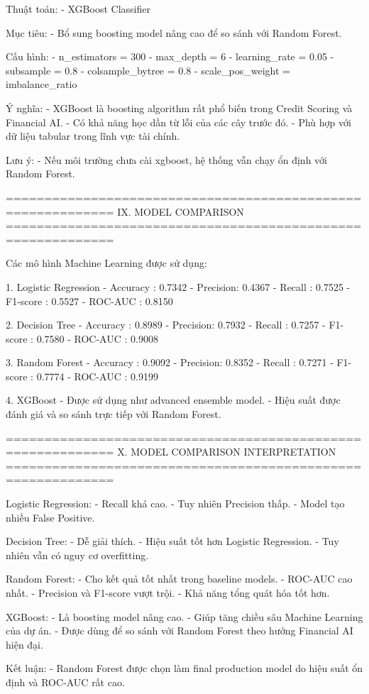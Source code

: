 Thuật toán:
- XGBoost Classifier

Mục tiêu:
- Bổ sung boosting model nâng cao để so sánh với Random Forest.

Cấu hình:
- n_estimators = 300
- max_depth = 6
- learning_rate = 0.05
- subsample = 0.8
- colsample_bytree = 0.8
- scale_pos_weight = imbalance_ratio

Ý nghĩa:
- XGBoost là boosting algorithm rất phổ biến trong Credit Scoring và Financial AI.
- Có khả năng học dần từ lỗi của các cây trước đó.
- Phù hợp với dữ liệu tabular trong lĩnh vực tài chính.

Lưu ý:
- Nếu môi trường chưa cài xgboost, hệ thống vẫn chạy ổn định với Random Forest.

============================================================
IX. MODEL COMPARISON
============================================================

Các mô hình Machine Learning được sử dụng:

1. Logistic Regression
- Accuracy : 0.7342
- Precision: 0.4367
- Recall   : 0.7525
- F1-score : 0.5527
- ROC-AUC  : 0.8150

2. Decision Tree
- Accuracy : 0.8989
- Precision: 0.7932
- Recall   : 0.7257
- F1-score : 0.7580
- ROC-AUC  : 0.9008

3. Random Forest
- Accuracy : 0.9092
- Precision: 0.8352
- Recall   : 0.7271
- F1-score : 0.7774
- ROC-AUC  : 0.9199

4. XGBoost
- Được sử dụng như advanced ensemble model.
- Hiệu suất được đánh giá và so sánh trực tiếp với Random Forest.

============================================================
X. MODEL COMPARISON INTERPRETATION
============================================================

Logistic Regression:
- Recall khá cao.
- Tuy nhiên Precision thấp.
- Model tạo nhiều False Positive.

Decision Tree:
- Dễ giải thích.
- Hiệu suất tốt hơn Logistic Regression.
- Tuy nhiên vẫn có nguy cơ overfitting.

Random Forest:
- Cho kết quả tốt nhất trong baseline models.
- ROC-AUC cao nhất.
- Precision và F1-score vượt trội.
- Khả năng tổng quát hóa tốt hơn.

XGBoost:
- Là boosting model nâng cao.
- Giúp tăng chiều sâu Machine Learning của dự án.
- Được dùng để so sánh với Random Forest theo hướng Financial AI hiện đại.

Kết luận:
- Random Forest được chọn làm final production model do hiệu suất ổn định và ROC-AUC rất cao.

